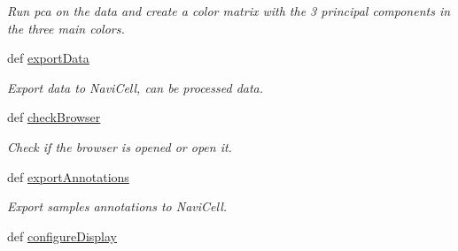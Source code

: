 \begin{DoxyCompactItemize}
\begin{DoxyCompactList}\small\item\em Run pca on the data and create a color matrix with the 3 principal components in the three main colors. \item\end{DoxyCompactList}\item 
def \hyperlink{classnavicom_1_1navicom_1_1NaviCom_a7395c2253695b46bf95cd48ed1be6d3e}{exportData}
\begin{DoxyCompactList}\small\item\em Export data to NaviCell, can be processed data. \item\end{DoxyCompactList}\item 
\hypertarget{classnavicom_1_1navicom_1_1NaviCom_aa7aadc5d33a24f0fd5705e363c0fedcb}{
def \hyperlink{classnavicom_1_1navicom_1_1NaviCom_aa7aadc5d33a24f0fd5705e363c0fedcb}{checkBrowser}}
\label{classnavicom_1_1navicom_1_1NaviCom_aa7aadc5d33a24f0fd5705e363c0fedcb}

\begin{DoxyCompactList}\small\item\em Check if the browser is opened or open it. \item\end{DoxyCompactList}\item 
\hypertarget{classnavicom_1_1navicom_1_1NaviCom_a5a59edead26b5d02f17a60df055576f5}{
def \hyperlink{classnavicom_1_1navicom_1_1NaviCom_a5a59edead26b5d02f17a60df055576f5}{exportAnnotations}}
\label{classnavicom_1_1navicom_1_1NaviCom_a5a59edead26b5d02f17a60df055576f5}

\begin{DoxyCompactList}\small\item\em Export samples annotations to NaviCell. \item\end{DoxyCompactList}\item 
\hypertarget{classnavicom_1_1navicom_1_1NaviCom_a5b6fef64cb29988c7a4c07138c03b5c1}{
def \hyperlink{classnavicom_1_1navicom_1_1NaviCom_a5b6fef64cb29988c7a4c07138c03b5c1}{configureDisplay}}
\label{classnavicom_1_1navicom_1_1NaviCom_a5b6fef64cb29988c7a4c07138c03b5c1}


\end{DoxyCompactItemize}
